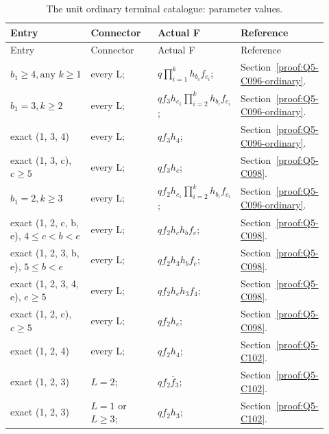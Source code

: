 \begingroup\small
\setlength{\tabcolsep}{3pt}
\setlength{\LTleft}{0pt}\setlength{\LTright}{\fill}
\begin{longtable}{@{}p{0.2200\linewidth}p{0.2333\linewidth}p{0.2333\linewidth}p{0.2333\linewidth}@{}}
\caption{The unit ordinary terminal catalogue: parameter values.}\label{tab:parameters:q5-c106:3}\\
\toprule
Entry & Connector & Actual F & Reference \\
\midrule\endfirsthead
\toprule
Entry & Connector & Actual F & Reference \\
\midrule\endhead
\bottomrule\endfoot
\(b_1\ge 4,\allowbreak  \text{any } k\ge 1\) & every L; & \(q \prod_{i=1}^k h_{b_i}f_{c_i}\); & Section~\ref{proof:Q5-C096-ordinary}. \\
\addlinespace[2pt]
\(b_1=3,\allowbreak k\ge 2\) & every L; & \(q f_3 h_{c_1} \prod_{i=2}^k h_{b_i}f_{c_i}\); & Section~\ref{proof:Q5-C096-ordinary}. \\
\addlinespace[2pt]
exact (1, 3, 4) & every L; & \(q f_3 h_4\); & Section~\ref{proof:Q5-C096-ordinary}. \\
\addlinespace[2pt]
exact (1, 3, c), \(c\ge 5\) & every L; & \(q f_3 h_c\); & Section~\ref{proof:Q5-C098}. \\
\addlinespace[2pt]
\(b_1=2,\allowbreak k\ge 3\) & every L; & \(q f_2 h_{c_1} \prod_{i=2}^k h_{b_i}f_{c_i}\); & Section~\ref{proof:Q5-C096-ordinary}. \\
\addlinespace[2pt]
exact (1, 2, c, b, e), \(4\le c<b<e\) & every L; & \(q f_2 h_c h_b f_e\); & Section~\ref{proof:Q5-C098}. \\
\addlinespace[2pt]
exact (1, 2, 3, b, e), \(5\le b<e\) & every L; & \(q f_2 h_3 h_b f_e\); & Section~\ref{proof:Q5-C098}. \\
\addlinespace[2pt]
exact (1, 2, 3, 4, e), \(e\ge 5\) & every L; & \(q f_2 h_e h_3 f_4\); & Section~\ref{proof:Q5-C098}. \\
\addlinespace[2pt]
exact (1, 2, c), \(c\ge 5\) & every L; & \(q f_2 h_c\); & Section~\ref{proof:Q5-C098}. \\
\addlinespace[2pt]
exact (1, 2, 4) & every L; & \(q f_2 h_4\); & Section~\ref{proof:Q5-C102}. \\
\addlinespace[2pt]
exact (1, 2, 3) & \(L=2\); & \(q f_2 \bar f_3\); & Section~\ref{proof:Q5-C102}. \\
\addlinespace[2pt]
exact (1, 2, 3) & \(L=1\) or \(L\ge 3\); & \(q f_2 h_3\); & Section~\ref{proof:Q5-C102}. \\
\end{longtable}
\endgroup


